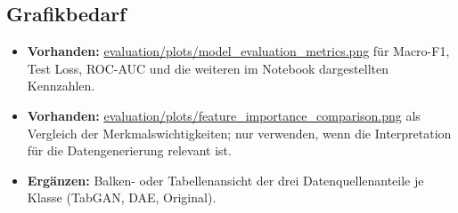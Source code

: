 \subsection{Grafikbedarf}
\begin{itemize}
  \item \textbf{Vorhanden:} \url{evaluation/plots/model_evaluation_metrics.png}
        für Macro-F1, Test Loss, ROC-AUC und die weiteren im Notebook
        dargestellten Kennzahlen.
  \item \textbf{Vorhanden:} \url{evaluation/plots/feature_importance_comparison.png}
        als Vergleich der Merkmalswichtigkeiten; nur verwenden, wenn die
        Interpretation für die Datengenerierung relevant ist.
  \item \textbf{Ergänzen:} Balken- oder Tabellenansicht der drei
        Datenquellenanteile je Klasse (TabGAN, DAE, Original).
\end{itemize}
